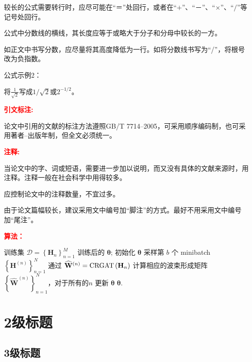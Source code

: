 较长的公式需要转行时，应尽可能在“$＝$”处回行，或者在“$+$”、“$－$”、“$\times$”、“$/$”等记号处回行。

公式中分数线的横线，其长度应等于或略大于分子和分母中较长的一方。

如正文中书写分数，应尽量将其高度降低为一行。如将分数线书写为“/”，将根号改为负指数。

公式示例2：

将$\frac{1}{\sqrt{2}}$写成$1/\sqrt{2}$或$2^{-1/2}$。

\textcolor{red}{\bf 引文标注:}

论文中引用的文献的标注方法遵照GB/T 7714--2005，可采用顺序编码制，也可采用著者--出版年制，但全文必须统一。

\textcolor{red}{\bf 注释:}

当论文中的字、词或短语，需要进一步加以说明，而又没有具体的文献来源时，用注释。注释一般在社会科学中用得较多。

应控制论文中的注释数量，不宜过多。

由于论文篇幅较长，建议采用文中编号加“脚注”的方式。最好不用采用文中编号加“尾注”。


\textcolor{red}{\bf 算法：}

\begin{algorithm}[ht]
    \caption{基于PM的无监督学习算法}
    \label{alg:PM}
    \renewcommand{\algorithmicrequire}{\textbf{输入:}}
    \renewcommand{\algorithmicensure}{\textbf{输出:}}
\begin{algorithmic}[1]
    \REQUIRE 训练集 $\mathcal{D}=\left\{\mathbf{H}_{n}\right\}_{n=1}^M$\;  %
    \ENSURE 训练后的 $\bm\theta$;    %
    \STATE 初始化 $\bm\theta$\;
            \STATE 采样第 $b$ 个 minibatch $ \left\{\mathbf{H}^{(n)}\right\}_{n=1}^N$\;
            \STATE 通过 $\widehat{\mathbf{W}}^{(n)} = {\rm CRGAT}\left({\bf H}_{n}\right)$ 计算相应的波束形成矩阵 $ \left\{{\widehat{\mathbf{W}}}^{(n)}\right\}_{n=1}^N$，对于所有的$n$\;
            \STATE 更新 $\bm{\theta}$\;
        \ENDFOR       
      \ENDFOR
    \RETURN $\bm\theta$.
\end{algorithmic}
\end{algorithm}


\section{2级标题}

\subsection{3级标题}
